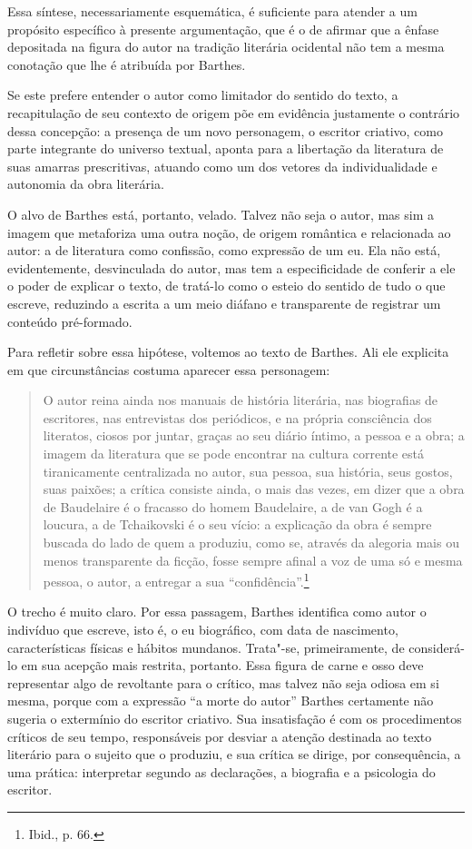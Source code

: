 Essa síntese, necessariamente esquemática, é suficiente para atender a
um propósito específico à presente argumentação, que é o de afirmar que
a ênfase depositada na figura do autor na tradição literária ocidental
não tem a mesma conotação que lhe é atribuída por Barthes.

Se este prefere entender o autor como limitador do sentido do texto, a
recapitulação de seu contexto de origem põe em evidência justamente o
contrário dessa concepção: a presença de um novo personagem, o escritor
criativo, como parte integrante do universo textual, aponta para a
libertação da literatura de suas amarras prescritivas, atuando como um
dos vetores da individualidade e autonomia da obra literária.

O alvo de Barthes está, portanto, velado. Talvez não seja o autor, mas
sim a imagem que metaforiza uma outra noção, de origem romântica e
relacionada ao autor: a de literatura como confissão, como expressão de
um eu. Ela não está, evidentemente, desvinculada do autor, mas tem a
especificidade de conferir a ele o poder de explicar o texto, de
tratá-lo como o esteio do sentido de tudo o que escreve, reduzindo a
escrita a um meio diáfano e transparente de registrar um conteúdo
pré-formado.

Para refletir sobre essa hipótese, voltemos ao texto de Barthes. Ali ele
explicita em que circunstâncias costuma aparecer essa personagem:

\begin{quote}
O autor reina ainda nos manuais de história literária, nas biografias de
escritores, nas entrevistas dos periódicos, e na própria consciência dos
literatos, ciosos por juntar, graças ao seu diário íntimo, a pessoa e a
obra; a imagem da literatura que se pode encontrar na cultura corrente
está tiranicamente centralizada no autor, sua pessoa, sua história, seus
gostos, suas paixões; a crítica consiste ainda, o mais das vezes, em
dizer que a obra de Baudelaire é o fracasso do homem Baudelaire, a de
van Gogh é a loucura, a de Tchaikovski é o seu vício: a explicação da
obra é sempre buscada do lado de quem a produziu, como se, através da
alegoria mais ou menos transparente da ficção, fosse sempre afinal a voz
de uma só e mesma pessoa, o autor, a entregar a sua
``confidência''.\footnote{Ibid., p. 66.}
\end{quote}

O trecho é muito claro. Por essa passagem, Barthes identifica como autor
o indivíduo que escreve, isto é, o eu biográfico, com data de
nascimento, características físicas e hábitos mundanos. Trata"-se,
primeiramente, de considerá-lo em sua acepção mais restrita, portanto.
Essa figura de carne e osso deve representar algo de revoltante para o
crítico, mas talvez não seja odiosa em si mesma, porque com a expressão
``a morte do autor'' Barthes certamente não sugeria o extermínio do
escritor criativo. Sua insatisfação é com os procedimentos críticos de
seu tempo, responsáveis por desviar a atenção destinada ao texto
literário para o sujeito que o produziu, e sua crítica se dirige, por
consequência, a uma prática: interpretar segundo as declarações, a
biografia e a psicologia do escritor.

